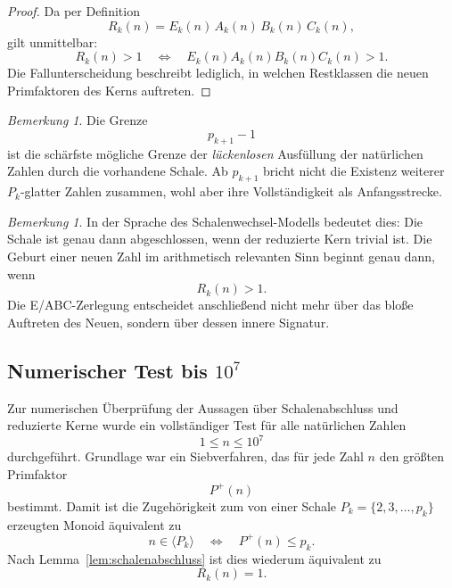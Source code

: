 \documentclass[11pt,a4paper]{article}
\theoremstyle{definition}
\theoremstyle{remark}
\newtheorem{bemerkung}[satz]{Bemerkung}
\begin{document}
	\begin{proof}
		Da per Definition
		\[
		R_k(n)=E_k(n)\,A_k(n)\,B_k(n)\,C_k(n),
		\]
		gilt unmittelbar:
		\[
		R_k(n)>1
		\quad\Longleftrightarrow\quad
		E_k(n)A_k(n)B_k(n)C_k(n)>1.
		\]
		Die Fallunterscheidung beschreibt lediglich, in welchen Restklassen die neuen
		Primfaktoren des Kerns auftreten.
	\end{proof}
	
	\begin{bemerkung}
		Die Grenze
		\[
		p_{k+1}-1
		\]
		ist die schärfste mögliche Grenze der \emph{lückenlosen} Ausfüllung der natürlichen Zahlen
		durch die vorhandene Schale. Ab \(p_{k+1}\) bricht nicht die Existenz weiterer
		\(P_k\)-glatter Zahlen zusammen, wohl aber ihre Vollständigkeit als Anfangsstrecke.
	\end{bemerkung}
	
	\begin{bemerkung}
		In der Sprache des Schalenwechsel-Modells bedeutet dies: Die Schale ist genau dann
		abgeschlossen, wenn der reduzierte Kern trivial ist. Die Geburt einer neuen Zahl im
		arithmetisch relevanten Sinn beginnt genau dann, wenn
		\[
		R_k(n)>1.
		\]
		Die E/ABC-Zerlegung entscheidet anschließend nicht mehr über das bloße Auftreten des
		Neuen, sondern über dessen innere Signatur.
	\end{bemerkung}
	
	\subsection{Numerischer Test bis \(10^7\)}
	
	Zur numerischen Überprüfung der Aussagen über Schalenabschluss und reduzierte Kerne
	wurde ein vollständiger Test für alle natürlichen Zahlen
	\[
	1\le n\le 10^7
	\]
	durchgeführt. Grundlage war ein Siebverfahren, das für jede Zahl \(n\) den größten
	Primfaktor
	\[
	P^+(n)
	\]
	bestimmt. Damit ist die Zugehörigkeit zum von einer Schale \(P_k=\{2,3,\dots,p_k\}\)
	erzeugten Monoid äquivalent zu
	\[
	n\in \langle P_k\rangle
	\quad\Longleftrightarrow\quad
	P^+(n)\le p_k.
	\]
	Nach Lemma~\ref{lem:schalenabschluss} ist dies wiederum äquivalent zu
	\[
	R_k(n)=1.
	\]
	
\end{document}
